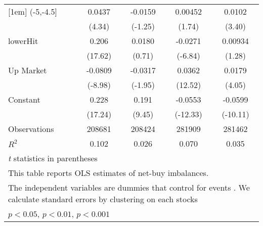 {\begin{tabular}{l*{4}{c}}
[1em]
(-5,-4.5]           &      0.0437\sym{***}&     -0.0159         &     0.00452         &      0.0102\sym{***}\\
                    &      (4.34)         &     (-1.25)         &      (1.74)         &      (3.40)         \\
[1em]
lowerHit            &       0.206\sym{***}&      0.0180         &     -0.0271\sym{***}&     0.00934         \\
                    &     (17.62)         &      (0.71)         &     (-6.84)         &      (1.28)         \\
[1em]
Up Market           &     -0.0809\sym{***}&     -0.0317         &      0.0362\sym{***}&      0.0179\sym{***}\\
                    &     (-8.98)         &     (-1.95)         &     (12.52)         &      (4.05)         \\
[1em]
Constant            &       0.228\sym{***}&       0.191\sym{***}&     -0.0553\sym{***}&     -0.0599\sym{***}\\
                    &     (17.24)         &      (9.45)         &    (-12.33)         &    (-10.11)         \\
\hline
Observations        &      208681         &      208424         &      281909         &      281462         \\
\(R^{2}\)           &       0.102         &       0.026         &       0.070         &       0.035         \\
\hline\hline
\multicolumn{5}{l}{\footnotesize \textit{t} statistics in parentheses}\\
\multicolumn{5}{l}{\footnotesize This table reports OLS estimates of net-buy imbalances.}\\
\multicolumn{5}{l}{\footnotesize The independent variables are dummies that control for events . We calculate standard errors by clustering on each stocks}\\
\multicolumn{5}{l}{\footnotesize \sym{*} \(p<0.05\), \sym{**} \(p<0.01\), \sym{***} \(p<0.001\)}\\
\end{tabular}
}
